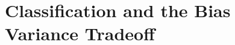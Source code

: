 \documentclass[12pt]{beamer}
\begin{document}






















\section{Classification and the Bias Variance Tradeoff}
\end{document}
